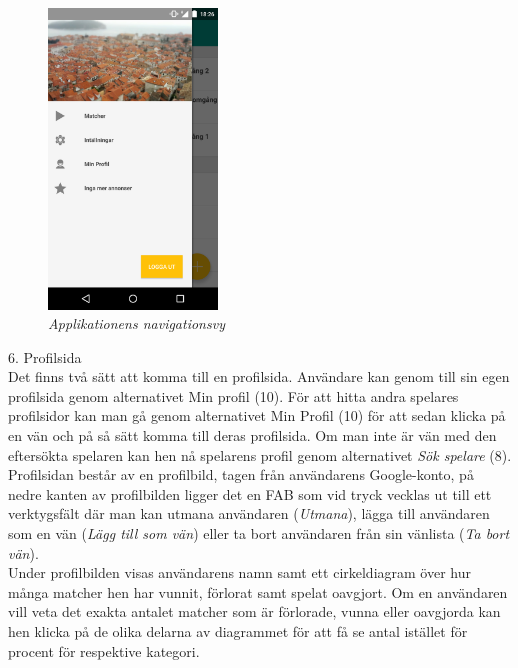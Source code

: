 \documentclass[a4paper, 11pt]{article}
\begin{document}
\begin{figure}[H]
	\begin{center}
	\includegraphics[width=0.4\textwidth]{app_drawer} 
	\end{center}
	\caption{\textit{Applikationens navigationsvy}}
\end{figure}


\pagebreak
\large \textup{6. Profilsida}\\
Det finns två sätt att komma till en profilsida. Användare kan genom till sin egen profilsida genom alternativet Min profil (10). För att hitta andra spelares profilsidor kan man gå genom alternativet Min Profil (10) för att sedan klicka på en vän och på så sätt komma till deras profilsida. Om man inte är vän med den eftersökta spelaren kan hen nå spelarens profil genom alternativet \textit{Sök spelare} (8).\\ Profilsidan består av en profilbild, tagen från användarens Google-konto, på nedre kanten av profilbilden ligger det en FAB som vid tryck vecklas ut till ett verktygsfält där man kan utmana användaren (\textit{Utmana}), lägga till användaren som en vän (\textit{Lägg till som vän}) eller ta bort användaren från sin vänlista (\textit{Ta bort vän}).\\ Under profilbilden visas användarens namn samt ett cirkeldiagram över hur många matcher hen har vunnit, förlorat samt spelat oavgjort. Om en användaren vill veta det exakta antalet matcher som är förlorade, vunna eller oavgjorda kan hen klicka på de olika delarna av diagrammet för att få se antal istället för procent för respektive kategori.
\end{document}

